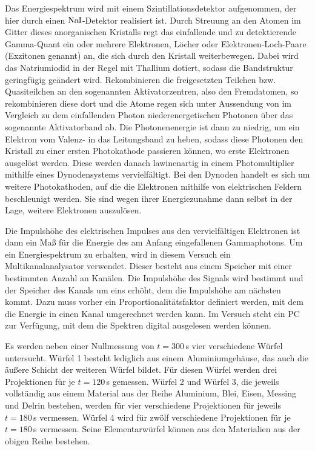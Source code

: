 Das Energiespektrum wird mit einem Szintillationsdetektor aufgenommen, der hier durch einen $\ce{NaI}$-Detektor realisiert ist. Durch Streuung an den Atomen im Gitter dieses anorganischen Kristalls regt das einfallende und zu detektierende Gamma-Quant ein oder mehrere Elektronen, Löcher oder Elektronen-Loch-Paare (Exzitonen genannt) an, die sich durch den Kristall weiterbewegen. Dabei wird das Natriumiodid in der Regel mit Thallium dotiert, sodass die Bandstruktur geringfügig geändert wird. Rekombinieren die freigesetzten Teilchen bzw. Quasiteilchen an den sogenannten Aktivatorzentren, also den Fremdatomen, so rekombinieren diese dort und die Atome regen sich unter Aussendung von im Vergleich zu dem einfallenden Photon niederenergetischen Photonen über das sogenannte Aktivatorband ab. Die Photonenenergie ist dann zu niedrig, um ein Elektron vom Valenz- in das Leitungsband zu heben, sodass diese Photonen den Kristall zu einer ersten Photokathode passieren können, wo erste Elektronen ausgelöst werden.
Diese werden danach lawinenartig in einem Photomultiplier mithilfe eines Dynodensystems vervielfältigt. Bei den Dynoden handelt es sich um weitere Photokathoden, auf die die Elektronen mithilfe von elektrischen Feldern beschleunigt werden. Sie sind wegen ihrer Energiezunahme dann selbst in der Lage, weitere Elektronen auszulösen.

Die Impulshöhe des elektrischen Impulses aus den vervielfältigen Elektronen ist dann ein Maß für die Energie des am Anfang eingefallenen Gammaphotons. Um ein Energiespektrum zu erhalten, wird in diesem Versuch ein Multikanalanalysator verwendet. Dieser besteht aus einem Speicher mit einer bestimmten Anzahl an Kanälen. Die Impulshöhe des Signals wird bestimmt und der Speicher des Kanals um eins erhöht, dem die Impulshöhe am nächsten kommt. Dazu muss vorher ein Proportionalitätsfaktor definiert werden, mit dem die Energie in einen Kanal umgerechnet werden kann.
Im Versuch steht ein PC zur Verfügung, mit dem die Spektren digital ausgelesen werden können.

Es werden neben einer Nullmessung von $t=300$\,s vier verschiedene Würfel untersucht. Würfel 1 besteht lediglich aus einem Aluminiumgehäuse, das auch die äußere Schicht der weiteren Würfel bildet. Für diesen Würfel werden drei Projektionen für je $t=120$\,s gemessen. Würfel 2 und Würfel 3, die jeweils vollständig aus einem Material aus der Reihe Aluminium, Blei, Eisen, Messing und Delrin bestehen, werden für vier verschiedene Projektionen für jeweils $t=180$\,s vermessen. Würfel 4 wird für zwölf verschiedene Projektionen für je $t=180$\,s vermessen. Seine Elementarwürfel können aus den Materialien aus der obigen Reihe bestehen.
